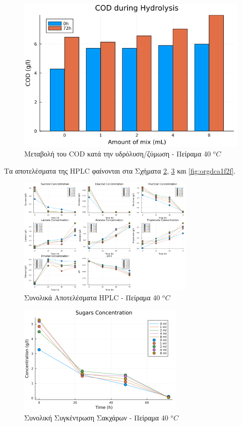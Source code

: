 \documentclass[11pt]{report}
\begin{document}
\begin{enumerate}
\pagebreak

\begin{figure}[htbp]
\centering
\includegraphics[width=.9\linewidth]{../plots/28_11/cod_groupedbar_28_11.png}
\caption{\label{fig:org3104e24}Μεταβολή του COD κατά την υδρόλυση/ζύμωση - Πείραμα 40 \(^oC\)}
\end{figure}

Τα αποτελέσματα της HPLC φαίνονται στα Σχήματα \ref{fig:orgd11419d}, \ref{fig:org489a541} και \ref{fig:orgdca1f2f}.

\begin{figure}[htbp]
\centering
\includegraphics[width=320px]{../plots/28_11/final_scatter_28_11.png}
\caption{\label{fig:orgd11419d}Συνολικά Αποτελέσματα HPLC - Πείραμα 40 \(^oC\)}
\end{figure}

\pagebreak

\begin{figure}[htbp]
\centering
\includegraphics[width=300px]{../plots/28_11/sugars_conc_scatter_28_11.png}
\caption{\label{fig:org489a541}Συνολική Συγκέντρωση Σακχάρων - Πείραμα 40 \(^oC\)}
\end{figure}


\end{enumerate}
\end{document}
